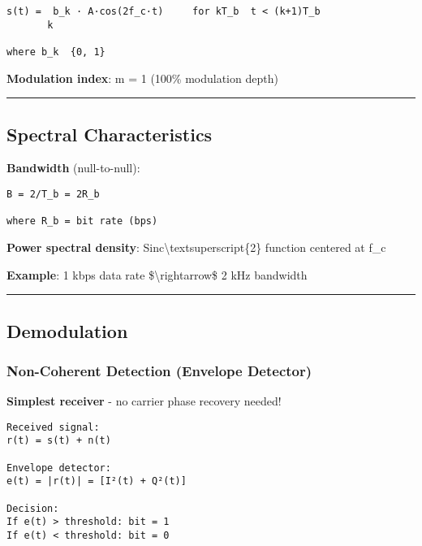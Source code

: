 \begin{verbatim}
s(t) =  b_k · A·cos(2f_c·t)     for kT_b  t < (k+1)T_b
       k

where b_k  {0, 1}
\end{verbatim}

\textbf{Modulation index}: m = 1 (100\% modulation depth)

\begin{center}\rule{0.5\linewidth}{0.5pt}\end{center}

\subsection{\texorpdfstring{ Spectral
Characteristics}{ Spectral Characteristics}}\label{spectral-characteristics}

\textbf{Bandwidth} (null-to-null):

\begin{verbatim}
B = 2/T_b = 2R_b

where R_b = bit rate (bps)
\end{verbatim}

\textbf{Power spectral density}: Sinc\textbackslash textsuperscript\{2\}
function centered at f\_c

\textbf{Example}: 1 kbps data rate \$\textbackslash rightarrow\$ 2 kHz
bandwidth

\begin{center}\rule{0.5\linewidth}{0.5pt}\end{center}

\subsection{\texorpdfstring{
Demodulation}{ Demodulation}}\label{demodulation}

\subsubsection{Non-Coherent Detection (Envelope
Detector)}\label{non-coherent-detection-envelope-detector}

\textbf{Simplest receiver} - no carrier phase recovery needed!

\begin{verbatim}
Received signal:
r(t) = s(t) + n(t)

Envelope detector:
e(t) = |r(t)| = [I²(t) + Q²(t)]

Decision:
If e(t) > threshold: bit = 1
If e(t) < threshold: bit = 0
\end{verbatim}

